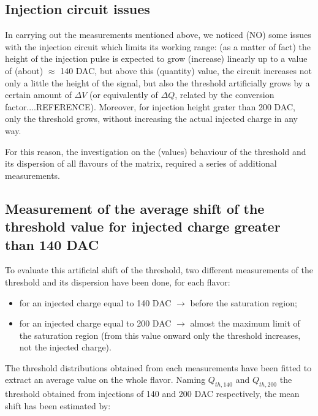 \subsection{Injection circuit issues}

In carrying out the measurements mentioned above, we noticed (NO) some issues with the injection circuit which limits its working range: (as a matter of fact) the height of the injection pulse is expected to grow (increase) linearly up to a value of (about) $\approx$ 140 DAC, but  above this (quantity) value, the circuit increases not only a little the height of the signal, but also the threshold artificially grows by a certain amount of $\Delta V$ (or equivalently of $\Delta Q$, related by the conversion factor....REFERENCE).
Moreover, for injection height grater than 200 DAC, only the threshold grows, without increasing the actual injected charge in any way.

For this reason, the investigation on the (values) behaviour of the threshold and its dispersion of all flavours of the matrix, required a series of additional measurements.

\subsection{Measurement of the average shift of the threshold value for injected charge greater than 140 DAC}

To evaluate this artificial shift of the threshold, two different measurements of the threshold and its dispersion have been done, for each flavor:

\begin{itemize}
\item for an injected charge equal to 140 DAC $\rightarrow$ before the saturation region;
\item for an injected charge equal to 200 DAC $\rightarrow$ almost the maximum limit of the saturation region (from this value onward only the threshold increases, not the injected charge).
\end{itemize}

The threshold distributions obtained from each measurements have been fitted to extract an average value on the whole flavor. Naming $Q_{th, 140}$ and $Q_{th, 200}$  the threshold obtained from injections of 140 and 200 DAC respectively, the mean shift has been estimated by:

